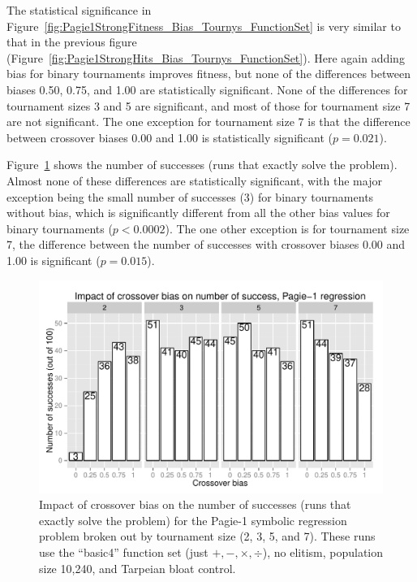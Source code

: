 \documentclass{sig-alternate}
\begin{document}
%
%
%
%

The statistical significance in Figure~\ref{fig:Pagie1StrongFitness_Bias_Tournys_FunctionSet} is very similar to that
in the previous figure (Figure~\ref{fig:Pagie1StrongHits_Bias_Tournys_FunctionSet}). Here again adding bias for binary
tournaments improves fitness, but none of the differences between biases 0.50, 0.75, and 1.00 are statistically
significant. None of the differences for tournament sizes 3 and 5 are significant, and most of those for tournament
size 7 are not significant. The one exception for tournament size 7 is that the difference between crossover biases
0.00 and 1.00 is statistically significant ($p = 0.021$).

Figure~\ref{fig:Pagie1StrongSuccesses} shows the number of successes (runs that exactly solve the problem). Almost none
of these differences are statistically significant, with the major exception being the small number of successes (3)
for binary tournaments without bias, which is significantly different from all the other bias values for binary
tournaments ($p<0.0002$). The one other exception is for tournament size 7, the difference between the number of
successes with crossover biases 0.00 and 1.00 is significant ($p=0.015$).

\begin{figure}
\centering
\includegraphics[width=0.45 \textwidth]{Plots/Pagie_1_Strong_Successes_vs_Bias.pdf}
\caption{Impact of crossover bias on the number of successes (runs that exactly solve the problem) for the Pagie-1
symbolic regression problem broken out by tournament size (2, 3, 5, and 7). These runs use the ``basic4'' function set
(just $+, -, \times, \div$), no elitism, population size 10,240, and Tarpeian bloat control.}
\label{fig:Pagie1StrongSuccesses}
\end{figure}
\end{document}
